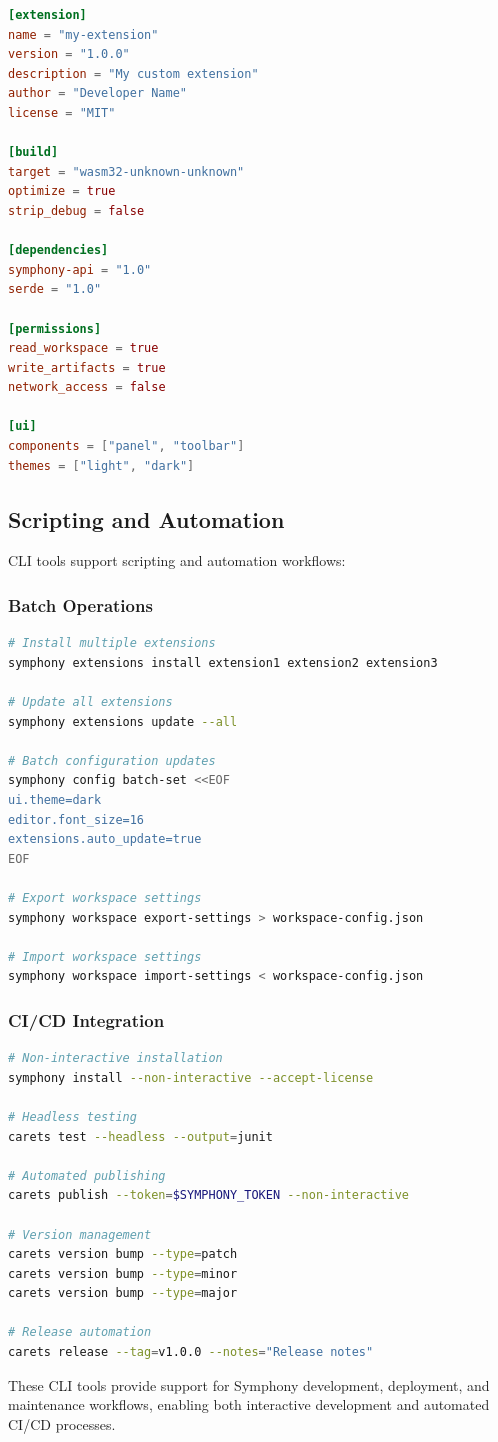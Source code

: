\begin{lstlisting}[language=toml,caption={Extension Configuration (extension.toml)}]
[extension]
name = "my-extension"
version = "1.0.0"
description = "My custom extension"
author = "Developer Name"
license = "MIT"

[build]
target = "wasm32-unknown-unknown"
optimize = true
strip_debug = false

[dependencies]
symphony-api = "1.0"
serde = "1.0"

[permissions]
read_workspace = true
write_artifacts = true
network_access = false

[ui]
components = ["panel", "toolbar"]
themes = ["light", "dark"]
\end{lstlisting}

\subsection*{Scripting and Automation}

CLI tools support scripting and automation workflows:

\subsubsection*{Batch Operations}

\begin{lstlisting}[language=bash,caption={Batch Operations}]
# Install multiple extensions
symphony extensions install extension1 extension2 extension3

# Update all extensions
symphony extensions update --all

# Batch configuration updates
symphony config batch-set <<EOF
ui.theme=dark
editor.font_size=16
extensions.auto_update=true
EOF

# Export workspace settings
symphony workspace export-settings > workspace-config.json

# Import workspace settings
symphony workspace import-settings < workspace-config.json
\end{lstlisting}

\subsubsection*{CI/CD Integration}

\begin{lstlisting}[language=bash,caption={CI/CD Integration}]
# Non-interactive installation
symphony install --non-interactive --accept-license

# Headless testing
carets test --headless --output=junit

# Automated publishing
carets publish --token=$SYMPHONY_TOKEN --non-interactive

# Version management
carets version bump --type=patch
carets version bump --type=minor
carets version bump --type=major

# Release automation
carets release --tag=v1.0.0 --notes="Release notes"
\end{lstlisting}

These CLI tools provide support for Symphony development, deployment, and maintenance workflows, enabling both interactive development and automated CI/CD processes.
